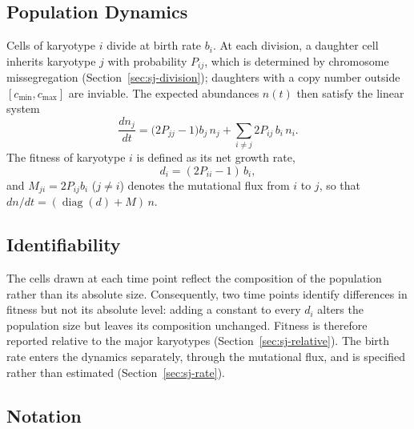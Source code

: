 \documentclass[11pt]{article}
\begin{document}
\subsection{Population Dynamics}

Cells of karyotype $i$ divide at birth rate $b_i$. At each division, a
daughter cell inherits karyotype $j$ with probability $P_{ij}$, which is
determined by chromosome missegregation (Section~\ref{sec:sj-division});
daughters with a copy number outside $[c_{\min},c_{\max}]$ are inviable. The
expected abundances $n(t)$ then satisfy the linear system
\begin{equation}
  \frac{dn_j}{dt}=\bigl(2P_{jj}-1\bigr)b_j\,n_j+\sum_{i\ne j}2P_{ij}\,b_i\,n_i .
  \label{eq:ode}
\end{equation}
The fitness of karyotype $i$ is defined as its net growth rate,
\begin{equation}
  d_i=(2P_{ii}-1)\,b_i ,
  \label{eq:net}
\end{equation}
and $M_{ji}=2P_{ij}b_i$ ($j\ne i$) denotes the mutational flux from $i$ to
$j$, so that $dn/dt=(\operatorname{diag}(d)+M)\,n$.

\subsection{Identifiability}

The cells drawn at each time point reflect the composition of the population
rather than its absolute size. Consequently, two time points identify differences in fitness
but not its absolute level: adding a constant to every $d_i$ alters the
population size but leaves its composition unchanged. Fitness is therefore
reported relative to the major karyotypes (Section~\ref{sec:sj-relative}).
The birth rate enters the dynamics separately, through the mutational flux,
and is specified rather than estimated (Section~\ref{sec:sj-rate}).

\subsection{Notation}
\end{document}

